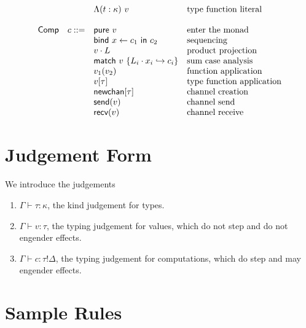 \documentclass[12pt]{article}
\begin{document}
\[\begin{array}{l r l l}
              &            & \Lambda (t : \kappa) \ v          & \text{type function literal} \\
\\
\textsf{Comp} &      c ::= & \textsf{pure} \ v                 & \text{enter the monad} \\
              &            & \textsf{bind} \ x \leftarrow c_1
                             \ \textsf{in} \ c_2               & \text{sequencing} \\
              &            & v \cdot L                         & \text{product projection} \\
              &            & \textsf{match} \ v \ \{
                             L_i \cdot x_i \hookrightarrow c_i
                             \}                                & \text{sum case analysis} \\
              &            & v_1 (v_2)                         & \text{function application} \\
              &            & v[\tau]                           & \text{type function application} \\
              &            & \textsf{newchan}[\tau]            & \text{channel creation} \\
              &            & \textsf{send}(v)                  & \text{channel send} \\
              &            & \textsf{recv}(v)                  & \text{channel receive} \\
\end{array}
\]

\newpage
\section{Judgement Form}

We introduce the judgements
\begin{enumerate}
\item $\Gamma \vdash \tau : \kappa$, the kind judgement for types.
\item $\Gamma \vdash v : \tau$, the typing judgement for values, which do not
step and do not engender effects.
\item $\Gamma \vdash c : \tau!\Delta$, the typing judgement for computations,
which do step and may engender effects.
\end{enumerate}

\newpage
\section{Sample Rules}
\end{document}
